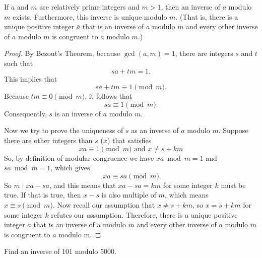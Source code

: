         \begin{theorem}
            If \( a \) and \( m \) are relatively prime integers and \( m > 1 \), then an inverse of \( a \) modulo \( m \) exists. Furthermore, this inverse is unique modulo \( m \). (That is, there is a unique positive integer \( \bar{a} \) that is an inverse of \( a \) modulo \( m \) and every other inverse of \( a \) modulo \( m \) is congruent to \( \bar{a} \) modulo \( m \).)
            \end{theorem}
            
            \begin{proof}
            By Bezout's Theorem, because \( \gcd(a, m) = 1 \), there are integers \( s \) and \( t \) such that
            \[
            sa + tm = 1.
            \]
            This implies that
            \[
            sa + tm \equiv 1 \pmod{m}.
            \]
            Because \( tm \equiv 0 \pmod{m} \), it follows that
            \[
            sa \equiv 1 \pmod{m}.
            \]
            Consequently, \( s \) is an inverse of \( a \) modulo \( m \).

            Now we try to prove the uniqueness of $s$ as an inverse of \( a \) modulo \( m \).
            Suppose there are other integers than $s$ ($x$) that satisfies  
            \[ xa \equiv 1 \pmod{m} \text{ and } x \neq s + km\]
            So, by definition of modular congruence we have $xa \bmod m = 1$ and $sa \bmod m = 1$, which
            gives
            $$xa \equiv sa \pmod m$$
            So $m\mid xa - sa$, and this means that $xa - sa = km$ for some integer $k$ must be true.
            If that is true, then $x-s$ is also multiple of $m$, which means $x\equiv s \pmod m$.
            Now recall our assumption that $x\neq s + km$, so $x = s + km$ for some integer $k$ refutes
            our assumption. Therefore, there is a unique positive integer $\bar{a}$ that is an inverse of a 
            modulo $m$ and every other inverse of $a$ modulo $m$ is congruent to $\bar{a}$ modulo m.
            \end{proof}
        
        \begin{example}
            Find an inverse of 101 modulo 5000.
        \end{example}

